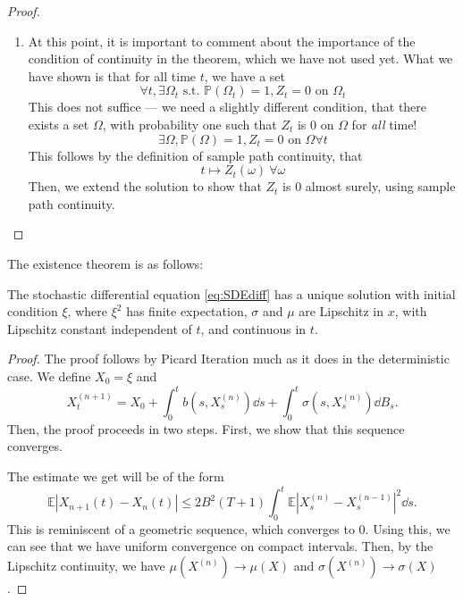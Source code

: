 \documentclass[prb,12pt]{revtex4-2}
\theoremstyle{definition}
\theoremstyle{definition}
\theoremstyle{definition}
\begin{document}
{\begin{proof}
\begin{enumerate}
			\[
			E(Z_t^2) \le 2K^2 (1+b-a)\int_a^t \mathbb{E}(Z_s^2)\dd{s}
			,\]
			{\color{red} This is a deterministic differential equation in the squared expectation value, and we have seen this in the theory of deterministic differential equations too. The standard method is to apply what is called Gronwall's inequality, which shows that
				\[E(Z_t^2) = 0~\forall t\]}
			\item {\color{red} At this point, it is important to comment about the importance of the condition of continuity in the theorem, which we have not used yet. What we have shown is that for all time $t$, we have a set
				\[\forall t, \exists \Omega_t \text{ s.t. }\mathbb{P}(\Omega_t) = 1, Z_t = 0\text{ on }\Omega_t\]
			This does not suffice --- we need a slightly different condition, that there exists a set $\Omega$, with probability one such that $Z_t$ is 0 on $\Omega$ for \emph{all} time!
			\[\exists \Omega, \mathbb{P}(\Omega) = 1, Z_t=0\text{ on }\Omega \forall t\]
			This follows by the definition of sample path continuity, that
			\[t\mapsto Z_t(\omega)~\forall \omega\]
		}
		 Then, we extend the solution to show that $Z_t$ is $0$ almost surely, using sample path continuity.\qedhere
		\end{enumerate}
	\end{proof}
	The existence theorem is as follows:
	\begin{Theorem}
		The stochastic differential equation \eqref{eq:SDEdiff} has a unique solution with initial condition $\xi$, where $\xi^2$ has finite expectation, $\sigma$ and $\mu$ are Lipschitz in $x$, with Lipschitz constant independent of $t$, and continuous in $t$.
	\end{Theorem}
	\begin{proof}
		The proof follows by Picard Iteration much as it does in the deterministic case. We define $X_0=\xi$ and
		\[
		X_t^{(n+1)}=X_0+\int_0^t b(s, X_s^{(n)})\dd{s}+\int_0^t \sigma(s, X_s^{(n)})\dd{B_s}
		.\] 
		Then, the proof proceeds in two steps. First, we show that this sequence converges.
		{\color{red} The estimate we get will be of the form
		\[
				\mathbb{E}|X_{n+1}(t) - X_n(t)|\le 2B^2(T+1)\int_0^t \mathbb{E}|X^{(n)}_s - X^{(n-1)}_s|^2\dd{s}
		.\]
		This is reminiscent of a geometric sequence, which converges to 0. Using this, we can see that we have uniform convergence on compact intervals. Then, by the Lipschitz continuity, we have $\mu(X^{(n)}) \to \mu(X)$ and $\sigma(X^{(n)})\to \sigma(X)$.
		
}
\end{proof}}
\end{document}
